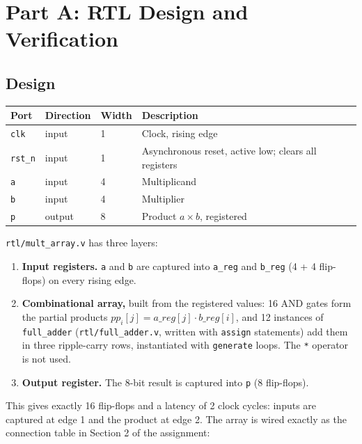 \documentclass[11pt,a4paper]{article}
\begin{document}
\section{Part A: RTL Design and Verification}

\subsection{Design}

\begin{table}[H]
\centering
\begin{tabular}{llll}
\toprule
Port & Direction & Width & Description \\
\midrule
\texttt{clk}   & input  & 1 & Clock, rising edge \\
\texttt{rst\_n} & input & 1 & Asynchronous reset, active low; clears all registers \\
\texttt{a}     & input  & 4 & Multiplicand \\
\texttt{b}     & input  & 4 & Multiplier \\
\texttt{p}     & output & 8 & Product $a \times b$, registered \\
\bottomrule
\end{tabular}
\end{table}

\texttt{rtl/mult\_array.v} has three layers:
\begin{enumerate}
  \item \textbf{Input registers.} \texttt{a} and \texttt{b} are captured into
        \texttt{a\_reg} and \texttt{b\_reg} (4 + 4 flip-flops) on every rising edge.
  \item \textbf{Combinational array,} built from the registered values: 16 AND
        gates form the partial products $pp_i[j] = a\_reg[j] \cdot b\_reg[i]$, and
        12 instances of \texttt{full\_adder} (\texttt{rtl/full\_adder.v}, written
        with \texttt{assign} statements) add them in three ripple-carry rows,
        instantiated with \texttt{generate} loops. The \texttt{*} operator is not used.
  \item \textbf{Output register.} The 8-bit result is captured into \texttt{p}
        (8 flip-flops).
\end{enumerate}
This gives exactly 16 flip-flops and a latency of 2 clock cycles: inputs are
captured at edge 1 and the product at edge 2. The array is wired exactly as the
connection table in Section 2 of the assignment:
\end{document}
